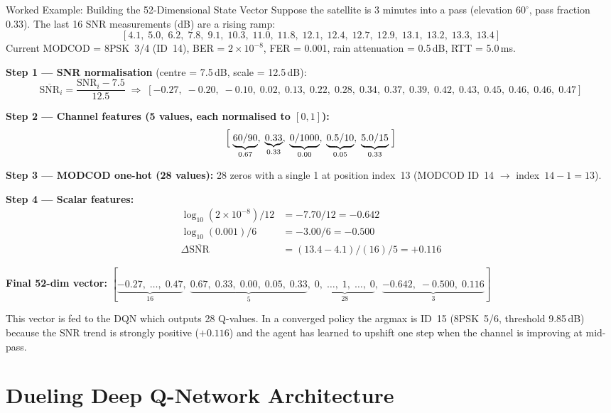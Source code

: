 \documentclass[12pt,a4paper]{report}
\begin{document}
\begin{conceptbox}{Worked Example: Building the 52-Dimensional State Vector}
Suppose the satellite is 3 minutes into a pass (elevation $60^\circ$,
pass fraction 0.33).  The last 16 SNR measurements (dB) are a rising ramp:
\[
[4.1,\;5.0,\;6.2,\;7.8,\;9.1,\;10.3,\;11.0,\;11.8,\;12.1,\;12.4,\;12.7,\;12.9,\;13.1,\;13.2,\;13.3,\;13.4]
\]
Current MODCOD = 8PSK~3/4 (ID~14), BER = $2\times10^{-8}$, FER = 0.001,
rain attenuation = 0.5\,dB, RTT = 5.0\,ms.

\textbf{Step 1 --- SNR normalisation} (centre = 7.5\,dB, scale = 12.5\,dB):
\[
  \overline{\text{SNR}}_i = \frac{\text{SNR}_i - 7.5}{12.5}
  \;\Rightarrow\; [-0.27,\;-0.20,\;-0.10,\;0.02,\;0.13,\;0.22,\;0.28,\;0.34,\;0.37,\;0.39,\;0.42,\;0.43,\;0.45,\;0.46,\;0.46,\;0.47]
\]

\textbf{Step 2 --- Channel features (5 values, each normalised to $[0,1]$):}
\[
  \Bigl[\;\underbrace{60/90}_{0.67},\;\underbrace{0.33}_{0.33},\;\underbrace{0/1000}_{0.00},\;\underbrace{0.5/10}_{0.05},\;\underbrace{5.0/15}_{0.33}\;\Bigr]
\]

\textbf{Step 3 --- MODCOD one-hot (28 values):}
28 zeros with a single 1 at position index~13 (MODCOD ID~14 $\to$ index~$14-1=13$).

\textbf{Step 4 --- Scalar features:}
\begin{align*}
  \log_{10}(2\times10^{-8})/12 &= -7.70/12 = -0.642 \\
  \log_{10}(0.001)/6           &= -3.00/6  = -0.500 \\
  \Delta\overline{\text{SNR}}  &= (13.4 - 4.1)/(16) / 5 = +0.116
\end{align*}

\textbf{Final 52-dim vector:}
$[\underbrace{-0.27,\;\ldots,\;0.47}_{16},\;\underbrace{0.67,\;0.33,\;0.00,\;0.05,\;0.33}_{5},\;\underbrace{0,\;\ldots,\;1,\;\ldots,\;0}_{28},\;\underbrace{-0.642,\;-0.500,\;0.116}_{3}]$

This vector is fed to the DQN which outputs 28 Q-values.  In a converged
policy the argmax is ID~15 (8PSK~5/6, threshold 9.85\,dB) because the
SNR trend is strongly positive ($+0.116$) and the agent has learned to
upshift one step when the channel is improving at mid-pass.
\end{conceptbox}

\section{Dueling Deep Q-Network Architecture}
\end{document}
